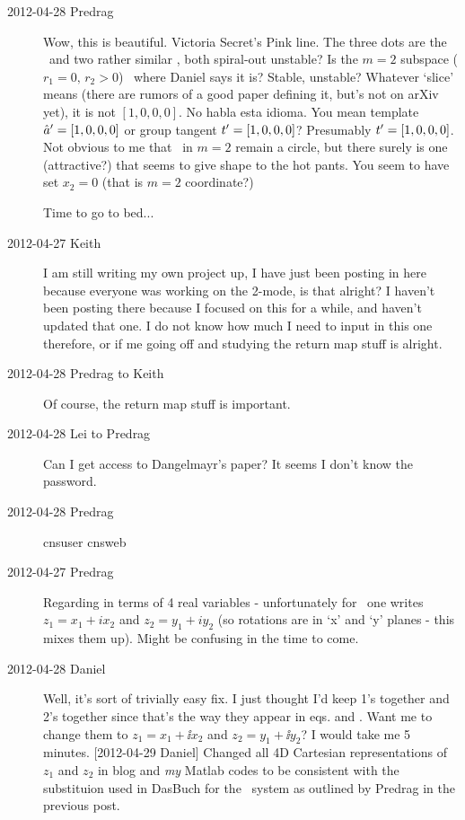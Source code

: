 \begin{description}
\item[2012-04-28 Predrag] Wow, this is beautiful. Victoria Secret's Pink
line. The three dots are the \eqv\ and two rather similar \reqva, both
spiral-out unstable? Is the $m=2$ subspace ($r_1 = 0,\, r_2 > 0$) \reqv\
where Daniel says it is? Stable, unstable? Whatever `slice' means (there
are rumors of a good paper defining it, but's not on arXiv yet), it is
not $[1, 0, 0, 0]$. No habla esta idioma. You mean template $\hat{a}' =
[1, 0, 0, 0]$ or group tangent $t'_{} = [1, 0, 0, 0]$? Presumably
$t'_{} = [1, 0, 0, 0]$. Not obvious to me that \reqv\ in $m=2$
remain a circle, but there surely is one (attractive?) that seems to give
shape to the hot pants. You seem to have set $x_2=0$ (that is $m=2$
coordinate?)

Time to go to bed...

\item[2012-04-27 Keith]  I am still writing my own project up, I have
just been posting in here because everyone was working on the 2-mode, is
that alright?  I haven't been posting there because I focused on this for
a while, and haven't updated that one.  I do not know how much I need to
input in this one therefore, or if me going off and studying the return
map stuff is alright.

\item[2012-04-28 Predrag to Keith] Of course, the return
map stuff is important.

\item[2012-04-28 Lei to Predrag] Can I get access to Dangelmayr's paper?
It seems I don't know the password.

\item[2012-04-28 Predrag] cnsuser cnsweb

\item[2012-04-27 Predrag] Regarding  in terms of 4 real
variables \refeq{2mode4D}- unfortunately for \cLe\ one writes $z_1 = x_1
+ i x_2$ and $z_2 = y_1 + i y_2$ (so rotations are in `x' and `y' planes
- this mixes them up). Might be confusing in the time to come.

\item[2012-04-28 Daniel] Well, it's sort of trivially easy fix. I just
thought I'd keep 1's together and 2's together since that's the way they
appear in eqs. \refeq{eq:AGpolar} and \refeq{eq:DangSO2}. Want me to
change them to $z_1 = x_1 + \ii x_2$ and $z_2 = y_1 + \ii y_2$? I would
take me 5 minutes. [2012-04-29 Daniel] Changed all 4D Cartesian representations
of $z_1$ and $z_2$ in blog and \emph{my} Matlab codes to be consistent with the substituion used in DasBuch for
the \cLe\ system as outlined by Predrag in the previous post.


\end{description}
